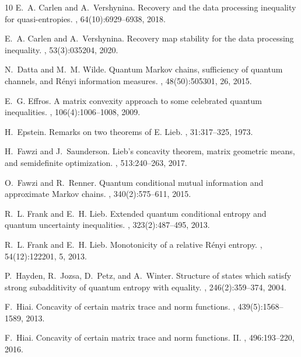 \documentclass{article}
\numberwithin{equation}{section}
\begin{document}
\begin{thebibliography}{10}
E.~A. Carlen and A.~Vershynina.
\newblock Recovery and the data processing inequality for quasi-entropies.
, 64(10):6929--6938, 2018.

E.~A. Carlen and A.~Vershynina.
\newblock Recovery map stability for the data processing inequality.
,
  53(3):035204, 2020.

N.~Datta and M.~M. Wilde.
\newblock Quantum {M}arkov chains, sufficiency of quantum channels, and
  {R}\'enyi information measures.
, 48(50):505301, 26, 2015.

E.~G. Effros.
\newblock A matrix convexity approach to some celebrated quantum inequalities.
, 106(4):1006--1008, 2009.

H.~Epstein.
\newblock Remarks on two theorems of {E}. {L}ieb.
, 31:317--325, 1973.

H.~Fawzi and J.~Saunderson.
\newblock Lieb's concavity theorem, matrix geometric means, and semidefinite
  optimization.
, 513:240--263, 2017.

O.~Fawzi and R.~Renner.
\newblock Quantum conditional mutual information and approximate {M}arkov
  chains.
, 340(2):575--611, 2015.

R.~L. Frank and E.~H. Lieb.
\newblock Extended quantum conditional entropy and quantum uncertainty
  inequalities.
, 323(2):487--495, 2013.

R.~L. Frank and E.~H. Lieb.
\newblock Monotonicity of a relative {R}\'enyi entropy.
, 54(12):122201, 5, 2013.

P.~Hayden, R.~Jozsa, D.~Petz, and A.~Winter.
\newblock Structure of states which satisfy strong subadditivity of quantum
  entropy with equality.
, 246(2):359--374, 2004.

F.~Hiai.
\newblock Concavity of certain matrix trace and norm functions.
, 439(5):1568--1589, 2013.

F.~Hiai.
\newblock Concavity of certain matrix trace and norm functions. {II}.
, 496:193--220, 2016.


\end{thebibliography}
\end{document}
